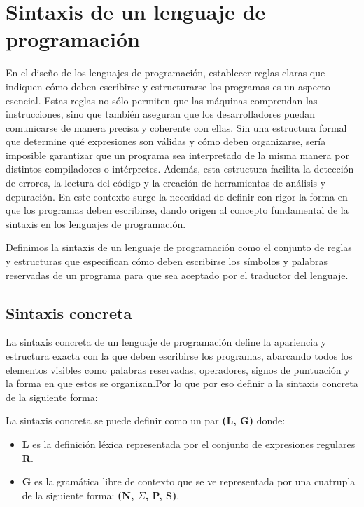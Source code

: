 \documentclass[a4paper,12pt]{article}
\begin{document}
\newpage
\section{Sintaxis de un lenguaje de programación}
En el diseño de los lenguajes de programación, establecer reglas claras que indiquen cómo deben escribirse y estructurarse los programas es un aspecto esencial. Estas reglas no sólo permiten que las máquinas comprendan las instrucciones, sino que también aseguran que los desarrolladores puedan comunicarse de manera precisa y coherente con ellas. Sin una estructura formal que determine qué expresiones son válidas y cómo deben organizarse, sería imposible garantizar que un programa sea interpretado de la misma manera por distintos compiladores o intérpretes. Además, esta estructura facilita la detección de errores, la lectura del código y la creación de herramientas de análisis y depuración. En este contexto surge la necesidad de definir con rigor la forma en que los programas deben escribirse, dando origen al concepto fundamental de la sintaxis en los lenguajes de programación.

\begin{tcolorbox}[title= Definición: Sintaxis de un lenguaje de programación]
Definimos la sintaxis de un lenguaje de programación como el conjunto de
reglas y estructuras que especifican cómo deben escribirse los símbolos y palabras reservadas de un
programa para que sea aceptado por el traductor del lenguaje.\cite{LambdaSpace2,UNAMMaterial}
\end{tcolorbox}

\subsection{Sintaxis concreta}

La sintaxis concreta de un lenguaje de programación define la apariencia y estructura exacta con la que deben escribirse los programas, abarcando todos los elementos visibles como palabras reservadas, operadores, signos de puntuación y la forma en que estos se organizan.Por lo que por eso definir a la sintaxis concreta de la siguiente forma:

\begin{tcolorbox}[title=Definición: Sintaxis concreta]
    La sintaxis concreta se puede definir como un par \textbf{(L, G)} donde:

\begin{itemize}
    \item \textbf{L} es la definición léxica representada por el conjunto de expresiones regulares \textbf{R}.
    \item \textbf{G} es la gramática libre de contexto que se ve representada por una cuatrupla de la siguiente forma: \textbf{(N, \(\Sigma\), P, S)}.\cite{UNAMTesis,LDPnota3}
\end{itemize}
\end{tcolorbox}
\end{document}
